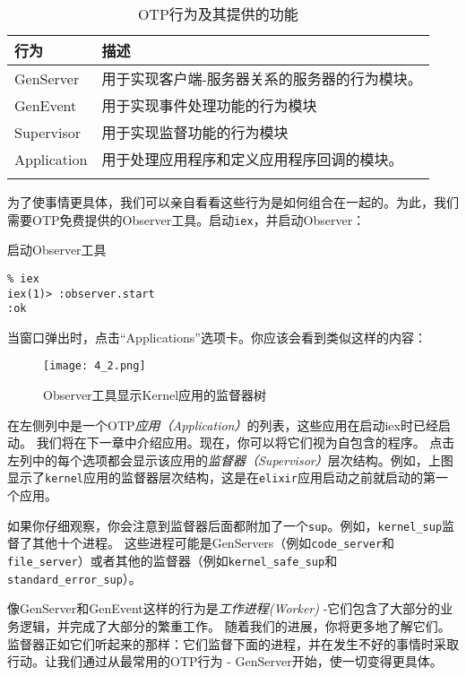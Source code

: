 \begin{longtable}[]{@{}ll@{}}
\toprule()
行为 & 描述 \\
\midrule()
\endhead
GenServer & 用于实现客户端-服务器关系的服务器的行为模块。 \\
GenEvent & 用于实现事件处理功能的行为模块 \\
Supervisor & 用于实现监督功能的行为模块 \\
Application & 用于处理应用程序和定义应用程序回调的模块。 \\
\bottomrule()
\caption{OTP行为及其提供的功能}
\label{table:otp_behaviours}
\end{longtable}

为了使事情更具体，我们可以亲自看看这些行为是如何组合在一起的。为此，我们需要OTP免费提供的Observer工具。启动\texttt{iex}，并启动Observer：

\begin{code}{启动Observer工具}
\begin{verbatim}
% iex
iex(1)> :observer.start
:ok
\end{verbatim}
\label{lst:start_observer}
\end{code}

当窗口弹出时，点击``Applications''选项卡。你应该会看到类似这样的内容：

\begin{figure}[!ht]
    \centering
    \texttt{[image: 4\_2.png]}
    \caption{Observer工具显示Kernel应用的监督器树}
    \label{fig:4_2}
\end{figure}


在左侧列中是一个OTP\emph{应用（Application）}的列表，这些应用在启动iex时已经启动。
我们将在下一章中介绍应用。现在，你可以将它们视为自包含的程序。
点击左列中的每个选项都会显示该应用的\emph{监督器（Supervisor）}层次结构。例如，上图显示了\texttt{kernel}应用的监督器层次结构，这是在\texttt{elixir}应用启动之前就启动的第一个应用。

如果你仔细观察，你会注意到监督器后面都附加了一个\texttt{sup}。例如，\texttt{kernel\_sup}监督了其他十个进程。
这些进程可能是GenServers（例如\texttt{code\_server}和\texttt{file\_server}）或者其他的监督器（例如\texttt{kernel\_safe\_sup}和\texttt{standard\_error\_sup}）。

像GenServer和GenEvent这样的行为是\emph{工作进程(Worker)} -它们包含了大部分的业务逻辑，并完成了大部分的繁重工作。
随着我们的进展，你将更多地了解它们。
监督器正如它们听起来的那样：它们监督下面的进程，并在发生不好的事情时采取行动。让我们通过从最常用的OTP行为 - GenServer开始，使一切变得更具体。

